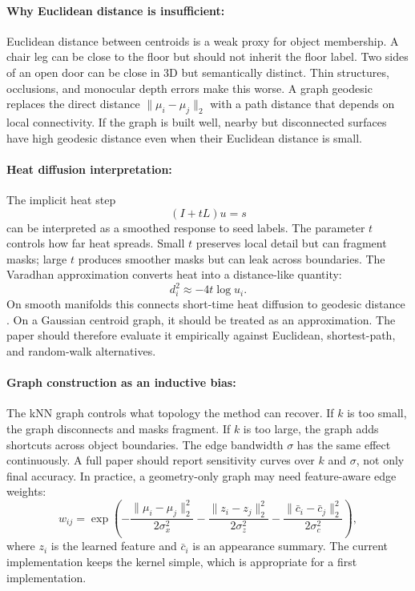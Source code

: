 \documentclass{article}
\begin{document}
\paragraph{Why Euclidean distance is insufficient:}

Euclidean distance between centroids is a weak proxy for object membership. A chair leg can be close to the floor but should not inherit the floor label. Two sides of an open door can be close in 3D but semantically distinct. Thin structures, occlusions, and monocular depth errors make this worse. A graph geodesic replaces the direct distance $\|\mu_i-\mu_j\|_2$ with a path distance that depends on local connectivity. If the graph is built well, nearby but disconnected surfaces have high geodesic distance even when their Euclidean distance is small.

\paragraph{Heat diffusion interpretation:}

The implicit heat step
\begin{equation}
  (I+tL)u=s
\end{equation}
can be interpreted as a smoothed response to seed labels. The parameter $t$ controls how far heat spreads. Small $t$ preserves local detail but can fragment masks; large $t$ produces smoother masks but can leak across boundaries. The Varadhan approximation converts heat into a distance-like quantity:
\begin{equation}
  d_i^2 \approx -4t\log u_i.
\end{equation}
On smooth manifolds this connects short-time heat diffusion to geodesic distance \citep{crane2013heat}. On a Gaussian centroid graph, it should be treated as an approximation. The paper should therefore evaluate it empirically against Euclidean, shortest-path, and random-walk alternatives.

\paragraph{Graph construction as an inductive bias:}

The kNN graph controls what topology the method can recover. If $k$ is too small, the graph disconnects and masks fragment. If $k$ is too large, the graph adds shortcuts across object boundaries. The edge bandwidth $\sigma$ has the same effect continuously. A full paper should report sensitivity curves over $k$ and $\sigma$, not only final accuracy. In practice, a geometry-only graph may need feature-aware edge weights:
\begin{equation}
  w_{ij}=
  \exp\left(-\frac{\|\mu_i-\mu_j\|_2^2}{2\sigma_x^2}
             -\frac{\|z_i-z_j\|_2^2}{2\sigma_z^2}
             -\frac{\|\bar{c}_i-\bar{c}_j\|_2^2}{2\sigma_c^2}\right),
\end{equation}
where $z_i$ is the learned feature and $\bar{c}_i$ is an appearance summary. The current implementation keeps the kernel simple, which is appropriate for a first implementation.
\end{document}
